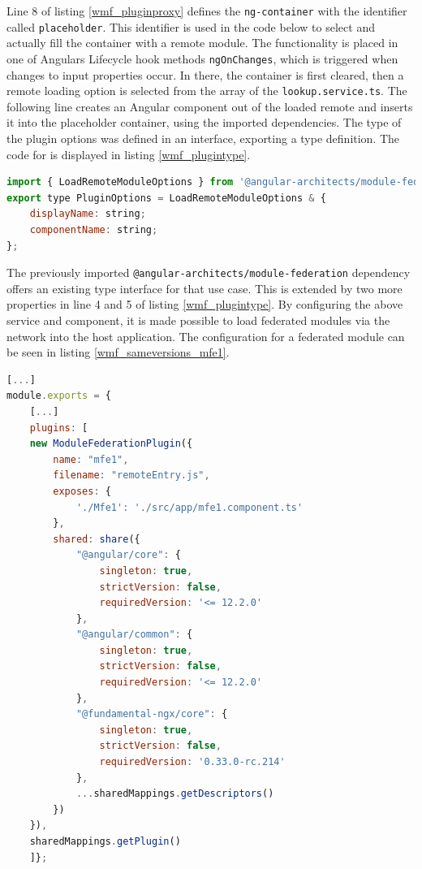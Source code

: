 Line 8 of listing \ref{wmf_pluginproxy} defines the \texttt{ng-container} with the identifier called \texttt{placeholder}. This identifier is used in the code below to select and actually fill the container with a remote module. The functionality is placed in one of Angulars Lifecycle hook methods \texttt{ngOnChanges}, which is triggered when changes to input properties occur.\cite{wmf_angular_lifecyclehooks} 
In there, the container is first cleared, then a remote loading option is selected from the array of the \texttt{lookup.service.ts}. The following line creates an Angular component out of the loaded remote and inserts it into the placeholder container, using the imported dependencies.
The type of the plugin options was defined in an interface, exporting a type definition. The code for is displayed in listing \ref{wmf_plugintype}.
\newpage
\begin{lstlisting}[language=JavaScript, caption=Content of \texttt{plugin.ts} for remote module loading in shell applications, label=wmf_plugintype]
import { LoadRemoteModuleOptions } from '@angular-architects/module-federation';
export type PluginOptions = LoadRemoteModuleOptions & {
	displayName: string;
	componentName: string;
};
\end{lstlisting}

The previously imported \texttt{@angular-architects/module-federation} dependency offers an existing type interface for that use case. This is extended by two more properties in line 4 and 5 of listing \ref{wmf_plugintype}.
By configuring the above service and component, it is made possible to load federated modules via the network into the host application.
The configuration for a federated module can be seen in listing \ref{wmf_sameversions_mfe1}.

\begin{lstlisting}[language=JavaScript, caption=Content of \texttt{webpack.config.js} of the mfe1 remote app of the same versions WMF project, label=wmf_sameversions_mfe1]
[...]
module.exports = {
	[...]
	plugins: [
	new ModuleFederationPlugin({
		name: "mfe1",
		filename: "remoteEntry.js",
		exposes: {
			'./Mfe1': './src/app/mfe1.component.ts'
		},
		shared: share({
			"@angular/core": { 
				singleton: true, 
				strictVersion: false, 
				requiredVersion: '<= 12.2.0' 
			},
			"@angular/common": { 
				singleton: true, 
				strictVersion: false, 
				requiredVersion: '<= 12.2.0' 
			},
			"@fundamental-ngx/core": { 
				singleton: true, 
				strictVersion: false,
				requiredVersion: '0.33.0-rc.214' 
			},
			...sharedMappings.getDescriptors()
		})
	}),
	sharedMappings.getPlugin()
	]};
\end{lstlisting}

